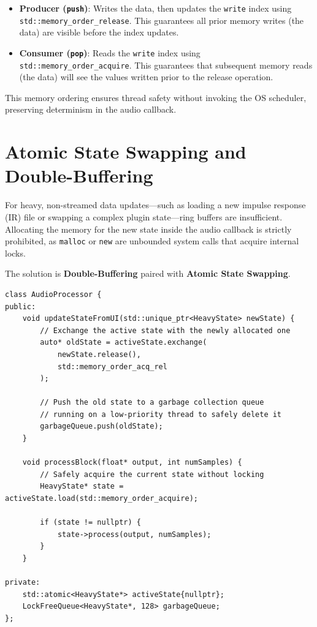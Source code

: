 \documentclass[11pt,a4paper]{article}
\begin{document}
\begin{itemize}
    \item \textbf{Producer (\texttt{push})}: Writes the data, then updates the \texttt{write} index using \texttt{std::memory\_order\_release}. This guarantees all prior memory writes (the data) are visible before the index updates.
    \item \textbf{Consumer (\texttt{pop})}: Reads the \texttt{write} index using \texttt{std::memory\_order\_acquire}. This guarantees that subsequent memory reads (the data) will see the values written prior to the release operation.
\end{itemize}

This memory ordering ensures thread safety without invoking the OS scheduler, preserving determinism in the audio callback.

\section{Atomic State Swapping and Double-Buffering}
For heavy, non-streamed data updates---such as loading a new impulse response (IR) file or swapping a complex plugin state---ring buffers are insufficient. Allocating the memory for the new state inside the audio callback is strictly prohibited, as \texttt{malloc} or \texttt{new} are unbounded system calls that acquire internal locks.

The solution is \textbf{Double-Buffering} paired with \textbf{Atomic State Swapping}.

\begin{verbatim}
class AudioProcessor {
public:
    void updateStateFromUI(std::unique_ptr<HeavyState> newState) {
        // Exchange the active state with the newly allocated one
        auto* oldState = activeState.exchange(
            newState.release(), 
            std::memory_order_acq_rel
        );
        
        // Push the old state to a garbage collection queue 
        // running on a low-priority thread to safely delete it
        garbageQueue.push(oldState); 
    }

    void processBlock(float* output, int numSamples) {
        // Safely acquire the current state without locking
        HeavyState* state = activeState.load(std::memory_order_acquire);
        
        if (state != nullptr) {
            state->process(output, numSamples);
        }
    }

private:
    std::atomic<HeavyState*> activeState{nullptr};
    LockFreeQueue<HeavyState*, 128> garbageQueue;
};
\end{verbatim}
\end{document}
